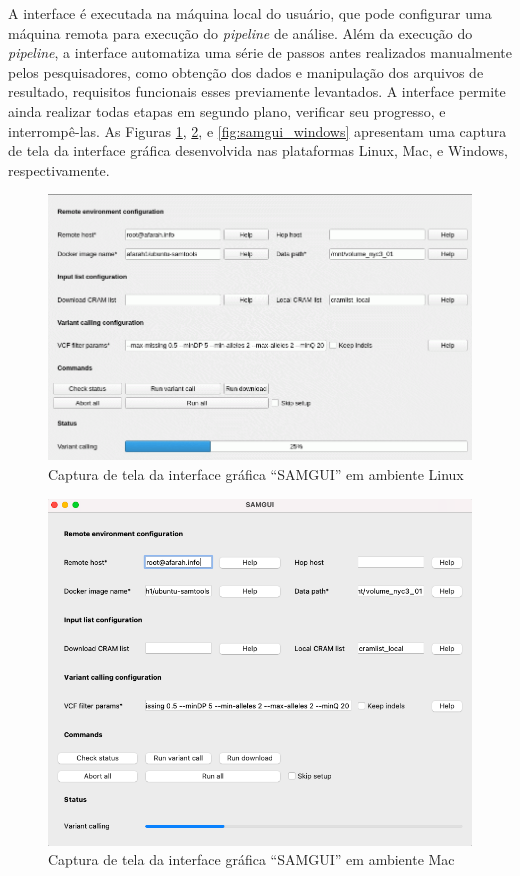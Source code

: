 \documentclass[cic,tc]{iiufrgs}
\begin{document}
A interface é executada na máquina local do usuário, que pode configurar uma
máquina remota para execução do \textit{pipeline} de análise. Além da execução
do \textit{pipeline}, a interface automatiza uma série de passos
antes realizados manualmente pelos pesquisadores, como obtenção dos dados e manipulação dos
arquivos de resultado, requisitos funcionais esses previamente levantados. A
interface permite ainda realizar todas etapas em segundo plano, verificar seu
progresso, e interrompê-las. As Figuras \ref{fig:samgui_linux},
\ref{fig:samgui_mac}, e \ref{fig:samgui_windows} apresentam uma captura de tela
da interface gráfica desenvolvida nas plataformas Linux, Mac, e Windows,
respectivamente.

\begin{figure}
  \caption{Captura de tela da interface gráfica ``SAMGUI'' em ambiente Linux}
    \begin{center}
      \includegraphics[width=0.85\linewidth]{img/samgui_linux.png}
    \end{center}
    \label{fig:samgui_linux}
\end{figure}

\begin{figure}
  \caption{Captura de tela da interface gráfica ``SAMGUI'' em ambiente Mac}
    \begin{center}
      \includegraphics[width=0.85\linewidth]{img/samgui_mac.png}
    \end{center}
    \label{fig:samgui_mac}
\end{figure}
\end{document}
